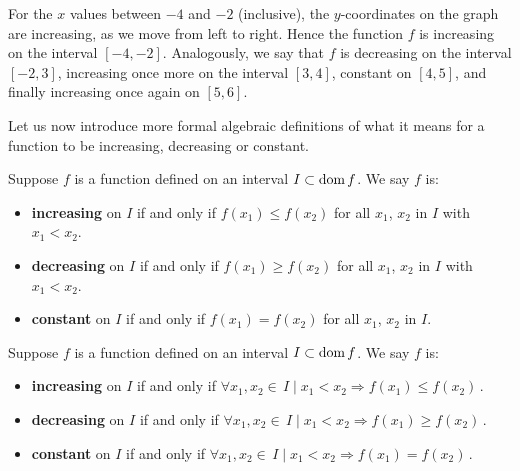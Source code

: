 For the $x$ values between $-4$ and $-2$ (inclusive), the $y$-coordinates on the graph are increasing, as we move from left to right.  Hence the function $f$ is increasing on the interval $[-4,-2]$.  Analogously, we say that $f$ is decreasing on the interval $[-2,3]$, increasing once more on the interval $[3,4]$, constant on $[4,5]$, and finally increasing once again on $[5,6]$.  

Let us now introduce more formal algebraic definitions of what it means for a function to be increasing, decreasing or constant.

\ifcalculus
\begin{definition}

\label{incdeccnstdefn}

Suppose $f$ is a function defined on an interval $I\subset\text{dom}{\,}f$.  We say $f$ is:

\vspace{-0.3cm}
\begin{itemize}
\item \textbf{increasing} on $I$ if and only if $f(x_1) \leq f(x_2)$ for all $x_1$, $x_2$ in $I$ with $x_1 < x_2$.

\item \textbf{decreasing} on $I$ if and only if $f(x_1) \geq f(x_2)$ for all  $x_1$, $x_2$ in $I$ with $x_1 < x_2$.

\item \textbf{constant} on $I$ if and only if $f(x_1) = f(x_2)$ for all  $x_1$, $x_2$ in $I$.

\end{itemize}
\end{definition}
\fi

\ifanalysis
\begin{definition}

\label{incdeccnstdefn}

Suppose $f$ is a function defined on an interval $I\subset\text{dom}{\,}f$.  We say $f$ is:
\vspace{-0.3cm}
\begin{itemize}
\item \textbf{increasing} on $I$ if and only if 
$
\forall x_1,x_2\in\,I\mid x_1<x_2\Rightarrow f(x_1) \leq f(x_2)\,.
$

\item \textbf{decreasing} on $I$ if and only if 
$
\forall x_1,x_2\in\,I\mid x_1<x_2\Rightarrow f(x_1) \geq f(x_2)\,.
$

\item \textbf{constant} on $I$ if and only if
$
\forall x_1,x_2\in\,I\mid x_1<x_2\Rightarrow f(x_1) =f(x_2)\,.
$

\end{itemize}
\end{definition}
\fi

